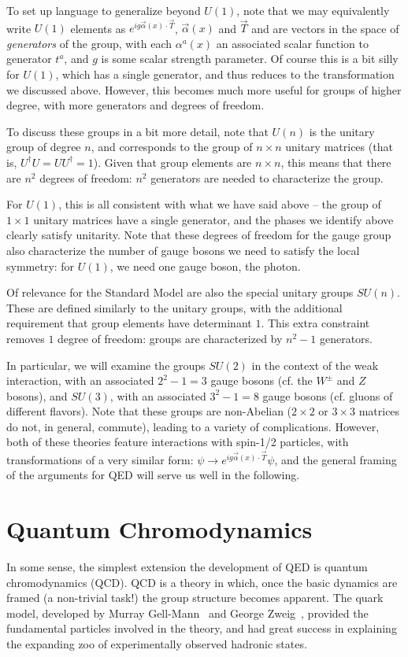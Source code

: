 To set up language to generalize beyond $U(1)$, note that we may equivalently write $U(1)$ elements as
$e^{ig\vec{\alpha}(x)\cdot \vec{T}}$, $\vec{\alpha}(x)$ and $\vec{T}$ and are vectors in the space of 
\emph{generators} of the group, with each $\alpha^{a}(x)$ an associated scalar function to generator $t^{a}$, 
and $g$ is some scalar strength parameter. Of course this is a bit silly for $U(1)$, which has a single generator, 
and thus reduces to the transformation we discussed above. However, this becomes much more useful for groups of higher 
degree, with more generators and degrees of freedom.

To discuss these groups in a bit more detail, note that $U(n)$ is the unitary group of 
degree $n$, and corresponds to the group of $n \times n$ unitary matrices (that is, $U^{\dagger}U = UU^{\dagger} = 1$).
Given that group elements are $n\times n$, this means that there are $n^2$ degrees of freedom:
$n^2$ generators are needed to characterize the group.

For $U(1)$, this is all consistent with what we have said above -- the group of $1 \times 1$ unitary matrices 
have a single generator, and the phases we identify above clearly satisfy unitarity. Note that these degrees 
of freedom for the gauge group also characterize the number of gauge bosons we need to satisfy the local symmetry: 
for $U(1)$, we need one gauge boson, the photon.

Of relevance for the Standard Model are also the special unitary groups $SU(n)$. These are defined similarly 
to the unitary groups, with the additional requirement that group elements have determinant $1$. This extra 
constraint removes $1$ degree of freedom: groups are characterized by $n^2-1$ generators.

In particular, we will examine the groups $SU(2)$ in the context of the weak interaction, with an associated
$2^2-1=3$ gauge bosons (cf. the $W^{\pm}$ and $Z$ bosons), and $SU(3)$, with an associated $3^2-1 = 8$ gauge bosons 
(cf. gluons of different flavors). Note that these groups are non-Abelian ($2\times 2$ or $3\times 3$ matrices do not, 
in general, commute), leading to a variety of complications. However, both of these theories feature interactions with 
spin-1/2 particles, with transformations of a very similar form: $\psi \rightarrow e^{ig\vec{\alpha}(x)\cdot \vec{T}}\psi$, 
and the general framing of the arguments for QED will serve us well in the following.


\section{Quantum Chromodynamics}
In some sense, the simplest extension the development of QED is quantum chromodynamics (QCD). QCD is a 
theory in which, once the basic dynamics are framed (a non-trivial task!) the group structure becomes 
apparent. The quark model, developed by Murray Gell-Mann~\cite{Gell-Mann} and George Zweig~\cite{Zweig}, provided the 
fundamental particles involved in the theory, and had great success in explaining the expanding zoo 
of experimentally observed hadronic states.

